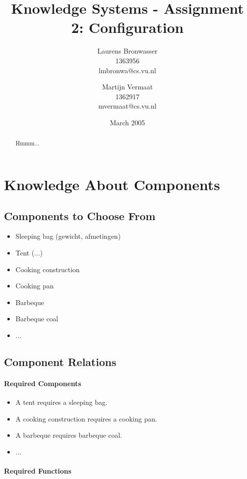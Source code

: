 \documentclass[a4paper,11pt]{article}
\title{Knowledge Systems - Assignment 2: Configuration}
\author{Laurens Bronwasser\\
1363956\\
lmbronwa@cs.vu.nl
\and
Martijn Vermaat\\
1362917\\
mvermaat@cs.vu.nl}
\date{March 2005}
\begin{document}
\maketitle


\renewcommand{\abstractname}{Introduction} %
\begin{abstract}
  Hmmm...
\end{abstract}


\section*{Knowledge About Components}


\subsection*{Components to Choose From}

\begin{itemize}
\item Sleeping bag (gewicht, afmetingen)
\item Tent (...)
\item Cooking construction
\item Cooking pan
\item Barbeque
\item Barbeque coal
\item ...
\end{itemize}


\subsection*{Component Relations}

\paragraph{Required Components}

\begin{itemize}
\item A tent requires a sleeping bag.
\item A cooking construction requires a cooking pan.
\item A barbeque requires barbeque coal.
\item ...
\end{itemize}

\paragraph{Required Functions}
\end{document}
